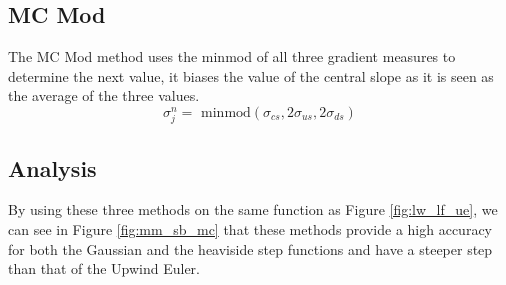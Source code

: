 \subsection{MC Mod}
The MC Mod method uses the minmod of all three gradient measures to determine the next value, it biases the value of the central slope as it is seen as the average of the three values.
\begin{equation*}
  \sigma^n_j = \text{ minmod}(\sigma_{cs},2\sigma_{us},2\sigma_{ds})
\end{equation*}
\subsection{Analysis}
By using these three methods on the same function as Figure \ref{fig:lw_lf_ue}, we can see in Figure \ref{fig:mm_sb_mc} that these methods provide a high accuracy for both the Gaussian and the heaviside step functions and have a steeper step than that of the Upwind Euler.